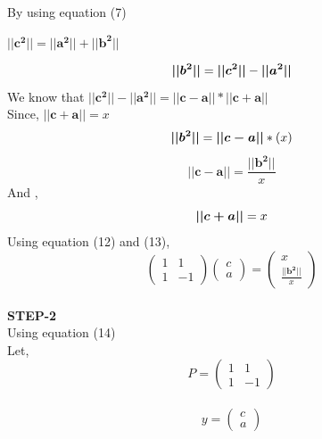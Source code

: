 \documentclass[10pt,a4paper]{report}
\begin{document}
\begin{multicols}{2}
By using equation (7)
\begin{center}
    $ \boldsymbol{||c^2||} = \boldsymbol{||a^2||} + \boldsymbol{||b^2||}$ \vspace{2mm}
\end{center}
\begin{equation}
    \boldsymbol{||b^2||} = \boldsymbol{||c^2||} - \boldsymbol{||a^2||} \vspace{2mm}
\end{equation}
We know that $\boldsymbol{||c^2||} - \boldsymbol{||a^2||} =  \boldsymbol{||c-a||*||c+a||}$\vspace{2mm}\\
Since, $ \boldsymbol{||c+a||}=x$
\begin{equation}
    \boldsymbol{||b^2||} = \boldsymbol{||c-a||}*(x) \vspace{2mm}
\end{equation}
\begin{equation}
  \boldsymbol{||c-a||} = \frac{ \boldsymbol{||b^2||}}{x}
\end{equation}
And ,
\begin{equation}
    \boldsymbol{||c+a||} = x \vspace{2mm}
\end{equation}
Using equation (12) and (13),
\begin{equation}
  \begin{pmatrix}
1 & 1\\
1 &-1
\end{pmatrix} 
\begin{pmatrix}
c\\
a
\end{pmatrix} = \begin{pmatrix}
x\\
\frac{ \boldsymbol{||b^2||}}{x}
\end{pmatrix} 
\end{equation}\vspace{2mm}\\

\textbf{STEP-2}\vspace{2mm}\\
Using equation (14) \vspace{2mm}\\
 Let,
\begin{equation}
  P =\begin{pmatrix}
1 & 1\\
1 &-1
\end{pmatrix} 
\end{equation} \\ \vspace{2mm}
\begin{equation}
  y =\begin{pmatrix}
c \\
a
\end{pmatrix} 
\end{equation}  \vspace{2mm}


\end{multicols}
\end{document}
